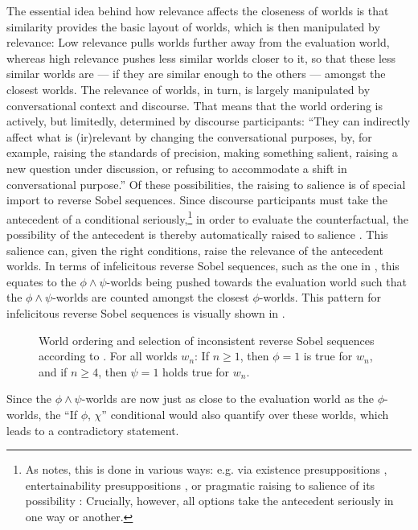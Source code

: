 The essential idea behind how relevance affects the closeness of worlds is that similarity provides the basic layout of worlds, which is then manipulated by relevance: Low relevance pulls worlds further away from the evaluation world, whereas high relevance pushes less similar worlds closer to it, so that these less similar worlds are --- if they are similar enough to the others --- amongst the closest worlds. The relevance of worlds, in turn, is largely manipulated by conversational context and discourse. That means that the world ordering is actively, but limitedly, determined by discourse participants: \enquote{They can indirectly affect what is (ir)relevant by changing the conversational purposes, by, for example, raising the standards of precision, making something salient, raising a new question under discussion, or refusing to accommodate a shift in conversational purpose.} \parencite[p. 500]{Lewis2018} Of these possibilities, the raising to salience is of special import to reverse Sobel sequences. Since discourse participants must take the antecedent of a conditional seriously,\footnote{As \textcite[p. 500]{Lewis2018} notes, this is done in various ways: e.g. via existence presuppositions \parencite{Fintel2001}, entertainability presuppositions \parencite{Gillies2007}, or pragmatic raising to salience of its possibility \parencite{Moss2012}: Crucially, however, all options take the antecedent seriously in one way or another.} in order to evaluate the counterfactual, the possibility of the antecedent is thereby automatically raised to salience \parencite{Lewis2018}. This salience can, given the right conditions, raise the relevance of the antecedent worlds. In terms of infelicitous reverse Sobel sequences, such as the one in , this equates to the $\phi\land\psi$-worlds being pushed towards the evaluation world such that the $\phi\land\psi$-worlds are counted amongst the closest $\phi$-worlds. This pattern for infelicitous reverse Sobel sequences is visually shown in .
\begin{figure}[!htb]

\caption{World ordering and selection of inconsistent reverse Sobel sequences according to \textcite{Lewis2018}. For all worlds $w_n$: If $n\geqslant1$, then $\phi=1$ is true for $w_n$, and if $n\geqslant 4$, then $\psi=1$ holds true for $w_n$.}
\end{figure}

\noindent Since the $\phi\land\psi$-worlds are now just as close to the evaluation world as the $\phi$-worlds, the \enquote{If $\phi$, $\chi$} conditional would also quantify over these worlds, which leads to a contradictory statement.

